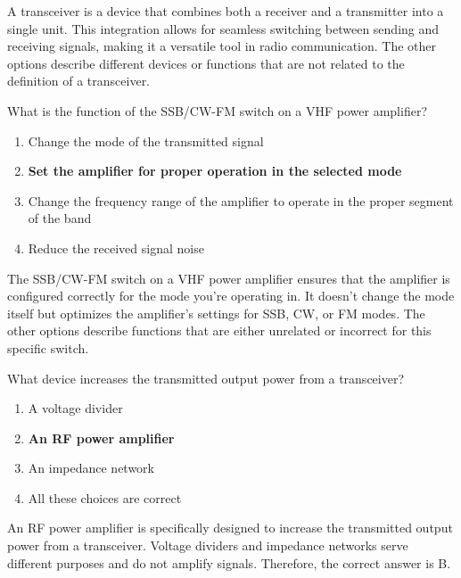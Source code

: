 A transceiver is a device that combines both a receiver and a transmitter into a single unit. This integration allows for seamless switching between sending and receiving signals, making it a versatile tool in radio communication. The other options describe different devices or functions that are not related to the definition of a transceiver.

\begin{tcolorbox}[colback=gray!10!white,colframe=black!75!black,title={T7A09}]
    What is the function of the SSB/CW-FM switch on a VHF power amplifier?
    \begin{enumerate}[label=\Alph*),noitemsep]
        \item Change the mode of the transmitted signal
        \item \textbf{Set the amplifier for proper operation in the selected mode}
        \item Change the frequency range of the amplifier to operate in the proper segment of the band
        \item Reduce the received signal noise
    \end{enumerate}
\end{tcolorbox}

The SSB/CW-FM switch on a VHF power amplifier ensures that the amplifier is configured correctly for the mode you're operating in. It doesn't change the mode itself but optimizes the amplifier's settings for SSB, CW, or FM modes. The other options describe functions that are either unrelated or incorrect for this specific switch.

\begin{tcolorbox}[colback=gray!10!white,colframe=black!75!black,title={T7A10}]
    What device increases the transmitted output power from a transceiver?
    \begin{enumerate}[label=\Alph*),noitemsep]
        \item A voltage divider
        \item \textbf{An RF power amplifier}
        \item An impedance network
        \item All these choices are correct
    \end{enumerate}
\end{tcolorbox}

An RF power amplifier is specifically designed to increase the transmitted output power from a transceiver. Voltage dividers and impedance networks serve different purposes and do not amplify signals. Therefore, the correct answer is B.

